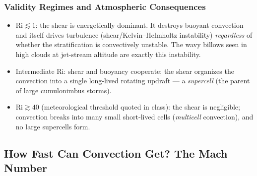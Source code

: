 \subsubsection*{Validity Regimes and Atmospheric Consequences}
\begin{itemize}
    \item $\mathrm{Ri}\lesssim1$: the shear is energetically dominant. It
    destroys buoyant convection and itself drives turbulence
    (shear/Kelvin--Helmholtz instability) \emph{regardless} of whether the
    stratification is convectively unstable. The wavy billows seen in high
    clouds at jet-stream altitude are exactly this instability.
    \item Intermediate $\mathrm{Ri}$: shear and buoyancy cooperate; the shear
    organizes the convection into a single long-lived rotating updraft --- a
    \emph{supercell} (the parent of large cumulonimbus storms).
    \item $\mathrm{Ri}\gtrsim40$ (meteorological threshold quoted in class):
    the shear is negligible; convection breaks into many small short-lived
    cells (\emph{multicell} convection), and no large supercells form.
\end{itemize}


\subsection{How Fast Can Convection Get? The Mach Number}
\label{sec:lec09:mach}

